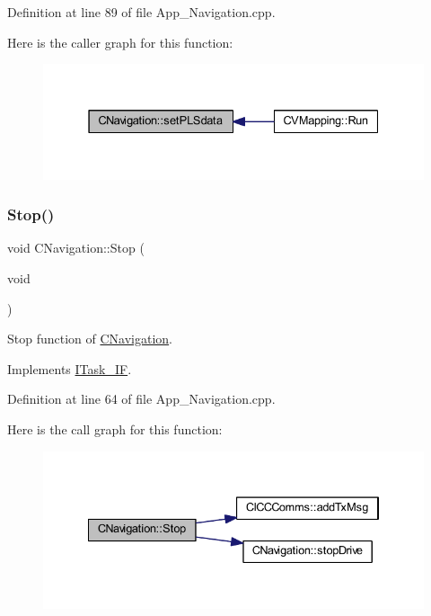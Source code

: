 Definition at line 89 of file App\+\_\+\+Navigation.\+cpp.

Here is the caller graph for this function\+:
\nopagebreak
\begin{figure}[H]
\begin{center}
\leavevmode
\includegraphics[width=331pt]{class_c_navigation_a53f0409677e36f62ef232f7e15b32948_icgraph}
\end{center}
\end{figure}
\mbox{\label{class_c_navigation_a3cc8f7fdd003d6b2c5056b87ff93edd9}} 
\subsubsection{\texorpdfstring{Stop()}{Stop()}}
{\footnotesize\ttfamily void C\+Navigation\+::\+Stop (\begin{DoxyParamCaption}\item[{void}]{ }\end{DoxyParamCaption})\hspace{0.3cm}{\ttfamily [virtual]}}



Stop function of \mbox{\hyperlink{class_c_navigation}{C\+Navigation}}. 



Implements \mbox{\hyperlink{class_i_task___i_f_af5f8fba86704c7e36d0e4681d58300c6}{I\+Task\+\_\+\+IF}}.



Definition at line 64 of file App\+\_\+\+Navigation.\+cpp.

Here is the call graph for this function\+:
\nopagebreak
\begin{figure}[H]
\begin{center}
\leavevmode
\includegraphics[width=334pt]{class_c_navigation_a3cc8f7fdd003d6b2c5056b87ff93edd9_cgraph}
\end{center}
\end{figure}
\mbox{\label{class_c_navigation_a06ce71124d487f1f9febf36a0e4b2a5d}} 
